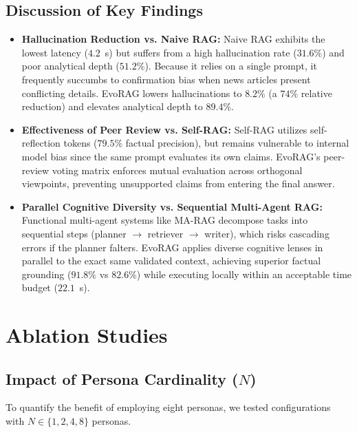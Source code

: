 \subsection{Discussion of Key Findings}
\begin{itemize}
    \item \textbf{Hallucination Reduction vs. Naive RAG:} Naive RAG exhibits the lowest latency ($4.2$~s) but suffers from a high hallucination rate ($31.6\%$) and poor analytical depth ($51.2\%$). Because it relies on a single prompt, it frequently succumbs to confirmation bias when news articles present conflicting details. EvoRAG lowers hallucinations to $8.2\%$ (a $74\%$ relative reduction) and elevates analytical depth to $89.4\%$.
    \item \textbf{Effectiveness of Peer Review vs. Self-RAG:} Self-RAG utilizes self-reflection tokens ($79.5\%$ factual precision), but remains vulnerable to internal model bias since the same prompt evaluates its own claims. EvoRAG's peer-review voting matrix enforces mutual evaluation across orthogonal viewpoints, preventing unsupported claims from entering the final answer.
    \item \textbf{Parallel Cognitive Diversity vs. Sequential Multi-Agent RAG:} Functional multi-agent systems like MA-RAG decompose tasks into sequential steps (planner $\to$ retriever $\to$ writer), which risks cascading errors if the planner falters. EvoRAG applies diverse cognitive lenses in parallel to the exact same validated context, achieving superior factual grounding ($91.8\%$ vs $82.6\%$) while executing locally within an acceptable time budget ($22.1$~s).
\end{itemize}

\section{Ablation Studies}
\label{sec:ablation_studies}

\subsection{Impact of Persona Cardinality ($N$)}
To quantify the benefit of employing eight personas, we tested configurations with $N \in \{1, 2, 4, 8\}$ personas.


